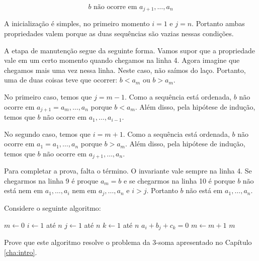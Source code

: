 \begin{displaymath}
b \textrm{ não ocorre em } a_{j+1}, \dots, a_n
\end{displaymath}

A inicialização é simples, no primeiro momento $i = 1$ e $j = n$.
Portanto ambas propriedades valem porque as duas sequências são vazias nessas condições.

A etapa de manutenção segue da seguinte forma.
Vamos supor que a propriedade vale em um certo momento quando chegamos na linha 4.
Agora imagine que chegamos mais uma vez nessa linha.
Neste caso, não saímos do laço.
Portanto, uma de duas coisas teve que ocorrer:
$b < a_m$ ou $b >a_m$.

No primeiro caso, temos que $j = m-1$.
Como a sequência está ordenada, $b$ não ocorre em $a_{j+1} = a_m, \dots, a_n$ porque $b < a_m$.
Além disso, pela hipótese de indução, temos que $b$ não ocorre em $a_1, \dots, a_{i-1}$.

No segundo caso, temos que $i = m+1$.
Como a sequência está ordenada, $b$ não ocorre em $a_{1} = a_{1}, \dots, a_n$ porque $b > a_m$.
Além disso, pela hipótese de indução, temos que $b$ não ocorre em $a_{j+1}, \dots, a_n$.

Para completar a prova, falta o término.
O invariante vale sempre na linha 4.
Se chegarmos na linha 9 é proque $a_m = b$ e se chegarmos na linha 10 é porque $b$ não está nem em $a_1, \dots, a_i$ nem em $a_j, \dots, a_n$ e $i > j$.
Portanto $b$ não está em $a_1, \dots, a_n$.

\vspace{2cm}

\begin{exercicio}
  Considere o seguinte algoritmo:

\begin{codebox}
  \li $m \gets 0$
  \li \For $i \gets 1$ até $n$
  \li \Do \For $j \gets 1$ até $n$
  \li     \Do \For $k \gets 1$ até $n$
  \li         \If $a_i + b_j + c_k = 0$
  \li         \Then $m \gets m + 1$
  \End
  \End
  \End
  \li \Return $m$
\end{codebox}

Prove que este algoritmo resolve o problema da 3-soma apresentado no Capítulo \ref{cha:intro}.
  
\end{exercicio}
